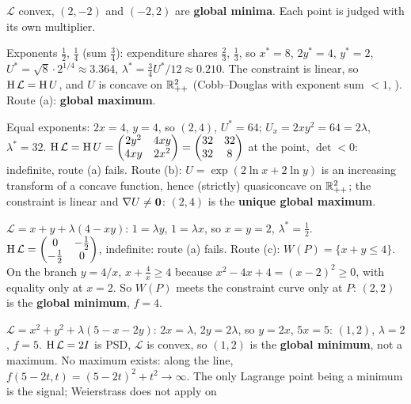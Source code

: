 \begin{solutions}
        $\mathcal{L}$ convex, $(2,-2)$ and $(-2,2)$ are \textbf{global
        minima}. Each point is judged with its own multiplier.
  \item Exponents $\tfrac12$, $\tfrac14$ (sum $\tfrac34$): expenditure
        shares $\tfrac23$, $\tfrac13$, so $x^*=8$, $2y^*=4$, $y^*=2$,
        $U^*=\sqrt8\cdot2^{1/4}\approx3.364$,
        $\lambda^*=\tfrac34U^*/12\approx0.210$. The constraint is linear, so
        $\operatorname{H}\mathcal{L}=\operatorname{H} U$, and $U$ is concave on $\mathbb{R}^{2}_{++}$
        (Cobb--Douglas with exponent sum $<1$, ). Route (a):
        \textbf{global maximum}.
  \item Equal exponents: $2x=4$, $y=4$, so $(2,4)$, $U^*=64$;
        $U_x=2xy^{2}=64=2\lambda$, $\lambda^*=32$. $\operatorname{H}\mathcal{L}=\operatorname{H} U
        =\begin{pmatrix}2y^{2}&4xy\\4xy&2x^{2}\end{pmatrix}
        =\begin{pmatrix}32&32\\32&8\end{pmatrix}$ at the point, $\det<0$:
        indefinite, route (a) fails. Route (b): $U=\exp(2\ln x+2\ln y)$ is
        an increasing transform of a concave function, hence (strictly)
        quasiconcave on $\mathbb{R}^{2}_{++}$; the constraint is linear and
        $\nabla U\neq\mathbf{0}$: $(2,4)$ is the \textbf{unique global
        maximum}.
  \item $\mathcal{L}=x+y+\lambda(4-xy)$: $1=\lambda y$, $1=\lambda x$, so
        $x=y=2$, $\lambda^*=\tfrac12$. $\operatorname{H}\mathcal{L}
        =\begin{pmatrix}0&-\tfrac12\\-\tfrac12&0\end{pmatrix}$, indefinite:
        route (a) fails. Route (c): $W(P)=\{x+y\le4\}$. On the branch
        $y=4/x$, $x+\tfrac4x\ge4$ because $x^{2}-4x+4=(x-2)^{2}\ge0$, with
        equality only at $x=2$. So $W(P)$ meets the constraint curve only at
        $P$: $(2,2)$ is the \textbf{global minimum}, $f=4$.
  \item $\mathcal{L}=x^{2}+y^{2}+\lambda(5-x-2y)$: $2x=\lambda$,
        $2y=2\lambda$, so $y=2x$, $5x=5$: $(1,2)$, $\lambda=2$, $f=5$.
        $\operatorname{H}\mathcal{L}=2I$ is PSD, $\mathcal{L}$ is convex, so $(1,2)$ is
        the \textbf{global minimum}, not a maximum. No maximum exists: along
        the line, $f(5-2t,t)=(5-2t)^{2}+t^{2}\to\infty$. The only Lagrange
        point being a minimum is the signal; Weierstrass does not apply on

\end{solutions}

